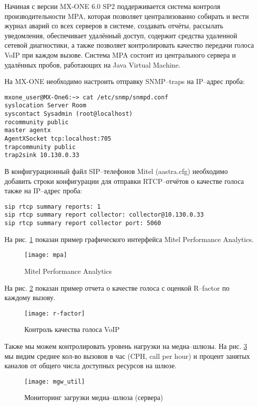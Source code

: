 Начиная с версии MX-ONE 6.0 SP2 поддерживается система контроля производительности MPA, которая позволяет централизованно собирать и вести журнал аварий со всех серверов в системе, создавать отчёты, рассылать уведомления, обеспечивает удалённый доступ, содержит средства удаленной сетевой диагностики, а также позволяет контролировать качество передачи голоса VoIP при каждом вызове. Система MPA состоит из центрального сервера и удалённых пробов, работающих на Java Virtual Machine.

На MX-ONE необходимо настроить отправку SNMP--traps на IP--адрес проба:
\begin{lstlisting}
mxone_user@MX-One6:~> cat /etc/snmp/snmpd.conf
syslocation Server Room
syscontact Sysadmin (root@localhost)
rocommunity public
master agentx
AgentXSocket tcp:localhost:705
trapcommunity public
trap2sink 10.130.0.33
\end{lstlisting}

В конфигурационный файл SIP--телефонов Mitel (aastra.cfg) необходимо добавить строки конфигурации для отправки RTCP--отчётов о качестве голоса также на IP--адрес проба:
\begin{lstlisting}
sip rtcp summary reports: 1
sip rtcp summary report collector: collector@10.130.0.33
sip rtcp summary report collector port: 5060
\end{lstlisting}

На рис. \ref{img:mpa} показан пример графического интерфейса Mitel Performance Analytics.
\begin{figure}[!ht]
  \center
  \texttt{[image: mpa]}
  \caption{Mitel Performance Analytics}
  \label{img:mpa}
\end{figure}

На рис. \ref{img:r-factor} показан пример отчета о качестве голоса с оценкой R--factor по каждому вызову.
\begin{figure}[!ht]
  \center
  \texttt{[image: r-factor]}
  \caption{Контроль качества голоса VoIP}
  \label{img:r-factor}
\end{figure}

Также мы можем контролировать уровень нагрузки на медиа--шлюзы. На  рис. \ref{img:mgw_util} мы видим среднее кол-во вызовов в час (CPH, call per hour) и процент занятых каналов от общего числа доступных ресурсов на шлюзе.  
\begin{figure}[!ht]
  \center
  \texttt{[image: mgw\_util]}
  \caption{Мониторинг загрузки медиа--шлюза (сервера)}
  \label{img:mgw_util}
\end{figure}

